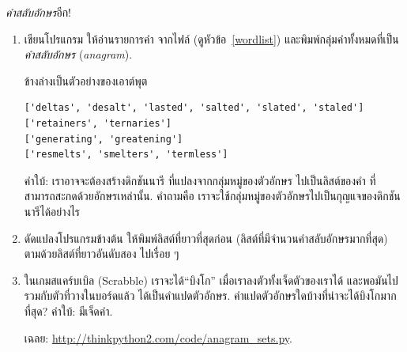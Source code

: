 \begin{exercise}
\label{anagrams}

\textit{คำสลับอักษร}อีก!

\begin{enumerate}


\item เขียนโปรแกรม ให้อ่านรายการคำ จากไฟล์ (ดูหัวข้อ~\ref{wordlist})
และพิมพ์กลุ่มคำทั้งหมดที่เป็น\textit{คำสลับอักษร} (\textit{anagram}).


ข้างล่างเป็นตัวอย่างของเอาต์พุต

\begin{verbatim}
['deltas', 'desalt', 'lasted', 'salted', 'slated', 'staled']
['retainers', 'ternaries']
['generating', 'greatening']
['resmelts', 'smelters', 'termless']
\end{verbatim}
%
%
คำใบ้: เราอาจจะต้องสร้างดิกชันนารี
ที่แปลงจากกลุ่มหมู่ของตัวอักษร
ไปเป็นลิสต์ของคำ ที่สามารถสะกดด้วยอักษรเหล่านั้น.
คำถามคือ เราจะใช้กลุ่มหมู่ของตัวอักษรไปเป็นกุญแจของดิกชันนารีได้อย่างไร


\item ดัดแปลงโปรแกรมข้างต้น ให้พิมพ์ลิสต์ที่ยาวที่สุดก่อน (ลิสต์ที่มีจำนวนคำสลับอักษรมากที่สุด) ตามด้วยลิสต์ที่ยาวอันดับสอง ไปเรื่อย ๆ


\item ในเกมสแคร์บเบิล (Scrabble) 
เราจะได้``บิงโก'' เมื่อเราลงตัวทั้งเจ็ดตัวของเราได้ และพอมันไปรวมกับตัวที่วางในบอร์ดแล้ว ได้เป็นคำแปดตัวอักษร.
คำแปดตัวอักษรใดบ้างที่น่าจะได้บิงโกมากที่สุด?
คำใบ้: มีเจ็ดคำ.



เฉลย: \url{http://thinkpython2.com/code/anagram_sets.py}.


\end{enumerate}
\end{exercise}
\vspace{0.5cm}


